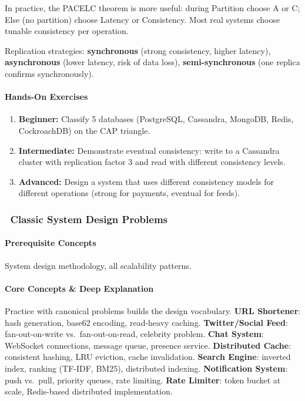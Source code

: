 \documentclass[11pt, a4paper, oneside]{report}
\newcommand{\mustmaster}[1]{\subsubsection{\texorpdfstring{\fcolorbox{blue!40!black}{blue!8}{\footnotesize\bfseries\color{blue!40!black} MUST MASTER}~#1}{#1}}}
\begin{document}
In practice, the PACELC theorem is more useful: during Partition choose A or C; Else (no partition) choose Latency or Consistency. Most real systems choose tunable consistency per operation.

Replication strategies: \textbf{synchronous} (strong consistency, higher latency), \textbf{asynchronous} (lower latency, risk of data loss), \textbf{semi-synchronous} (one replica confirms synchronously).

\paragraph{Hands-On Exercises}
\begin{enumerate}[leftmargin=*]
\item \textbf{Beginner:} Classify 5 databases (PostgreSQL, Cassandra, MongoDB, Redis, CockroachDB) on the CAP triangle.
\item \textbf{Intermediate:} Demonstrate eventual consistency: write to a Cassandra cluster with replication factor 3 and read with different consistency levels.
\item \textbf{Advanced:} Design a system that uses different consistency models for different operations (strong for payments, eventual for feeds).
\end{enumerate}

\mustmaster{Classic System Design Problems}

\paragraph{Prerequisite Concepts} System design methodology, all scalability patterns.

\paragraph{Core Concepts \& Deep Explanation} Practice with canonical problems builds the design vocabulary. \textbf{URL Shortener}: hash generation, base62 encoding, read-heavy caching. \textbf{Twitter/Social Feed}: fan-out-on-write vs.\ fan-out-on-read, celebrity problem. \textbf{Chat System}: WebSocket connections, message queue, presence service. \textbf{Distributed Cache}: consistent hashing, LRU eviction, cache invalidation. \textbf{Search Engine}: inverted index, ranking (TF-IDF, BM25), distributed indexing. \textbf{Notification System}: push vs.\ pull, priority queues, rate limiting. \textbf{Rate Limiter}: token bucket at scale, Redis-based distributed implementation.
\end{document}
